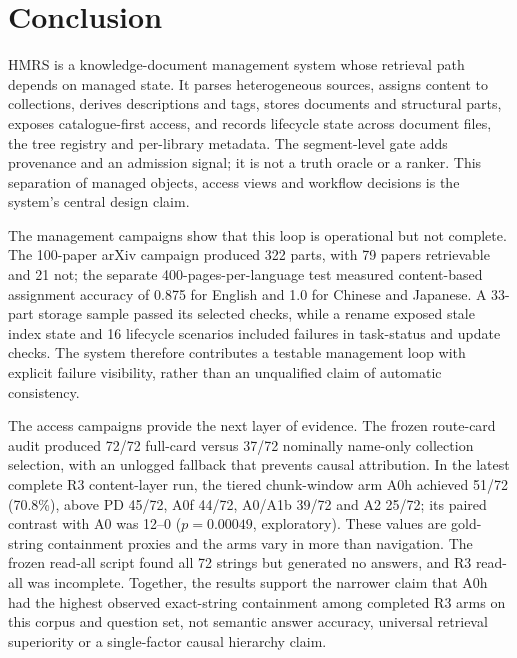 \section{Conclusion}
\label{sec:conclusion}

HMRS is a knowledge-document management system whose retrieval path depends on
managed state. It parses heterogeneous sources, assigns content to collections,
derives descriptions and tags, stores documents and structural parts, exposes
catalogue-first access, and records lifecycle state across document files, the
tree registry and per-library metadata. The segment-level gate adds provenance
and an admission signal; it is not a truth oracle or a ranker. This separation
of managed objects, access views and workflow decisions is the system's central
design claim.

The management campaigns show that this loop is operational but not complete.
The 100-paper arXiv campaign produced 322 parts, with 79 papers retrievable and
21 not; the separate 400-pages-per-language test measured content-based
assignment accuracy of 0.875 for English and 1.0 for Chinese and Japanese. A
33-part storage sample passed its selected checks, while a rename exposed stale
index state and 16 lifecycle scenarios included failures in task-status and
update checks. The system therefore contributes a testable management loop with
explicit failure visibility, rather than an unqualified claim of automatic
consistency.

The access campaigns provide the next layer of evidence. The frozen route-card
audit produced 72/72 full-card versus 37/72 nominally name-only collection
selection, with an unlogged fallback that prevents causal attribution. In the
latest complete R3 content-layer run, the tiered chunk-window arm A0h achieved
51/72 (70.8\%), above PD 45/72, A0f 44/72, A0/A1b 39/72 and A2 25/72; its paired
contrast with A0 was 12--0 ($p=0.00049$, exploratory). These values are
 gold-string containment proxies and the arms vary in more than navigation.
The frozen read-all script found all 72 strings but generated no answers, and
R3 read-all was incomplete. Together, the results support the narrower claim that A0h had the highest
observed exact-string containment among completed R3 arms on this corpus and
question set, not semantic answer accuracy, universal retrieval superiority or
a single-factor causal hierarchy claim.

